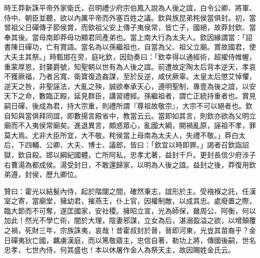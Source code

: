 \begin{pinyinscope}
時王莽新誅平帝外家衛氏，召明禮少府宗伯鳳入說為人後之誼，白令公卿、將軍、侍中、朝臣並聽，欲以內厲平帝而外塞百姓之議。欽與族昆弟秺侯當俱封。初，當曾祖父日磾傳子節侯賞，而欽祖父安上傳子夷侯常，皆亡子，國絕，故莽封欽、當奉其後。當母南即莽母功顯君同產弟也。當上南大行為太夫人。欽因緣謂當：「詔書陳日磾功，亡有賞語。當名為以孫繼祖也，自當為父、祖父立廟。賞故國君，使大夫主其祭。」時甄邯在旁，庭叱欽，因劾奏曰：「欽幸得以通經術，超擢侍帷幄，重蒙厚恩，封襲爵號，知聖朝以世有為人後之誼。前遭故定陶太后背本逆天，孝哀不獲厥福，乃者呂寬、衛寶復造姦謀，至於反逆，咸伏厥辜。太皇太后懲艾悼懼，逆天之咎，非聖誣法，大亂之殃，誠欲奉承天心，遵明聖制，專壹為後之誼，以安天下之命，數臨正殿，延見群臣，講習禮經。孫繼祖者，謂亡正統持重者也。賞見嗣日磾，後成為君，持大宗重，則禮所謂『尊祖故敬宗』，大宗不可以絕者也。欽自知與當俱拜同誼，即數揚言殿省中，教當云云。當即如其言，則欽亦欲為父明立廟而不入夷侯常廟矣。進退異言，頗惑眾心，亂國大綱，開禍亂原，誣祖不孝，罪莫大焉。尤非大臣所宜，大不敬。秺侯當上母南為太夫人，失禮不敬。」莽白太后，下四輔、公卿、大夫、博士、議郎，皆曰：「欽宜以時即罪。」謁者召欽詣詔獄，欽自殺。邯以綱紀國體，亡所阿私，忠孝尤著，益封千戶。更封長信少府涉子右曹湯為都成侯。湯受封日，不敢還歸家，以明為人後之誼。益封之後，莽復用欽弟遵，封侯，歷九卿位。

贊曰：霍光以結髮內侍，起於階闥之間，確然秉志，誼形於主。受襁褓之託，任漢室之寄，當廟堂，擁幼君，摧燕王，仆上官，因權制敵，以成其忠。處廢置之際，臨大節而不可奪，遂匡國家，安社稷。擁昭立宣，光為師保，雖周公、阿衡，何以加此！然光不學亡術，闇於大理，陰妻邪謀，立女為后，湛溺盈溢之欲，以增顛覆之禍，死財三年，宗族誅夷，哀哉！昔霍叔封於晉，晉即河東，光豈其苗裔乎？金日磾夷狄亡國，羈虜漢庭，而以篤敬寤主，忠信自著，勒功上將，傳國後嗣，世名忠孝，七世內侍，何其盛也！本以休屠作金人為祭天主，故因賜姓金氏云。


\end{pinyinscope}